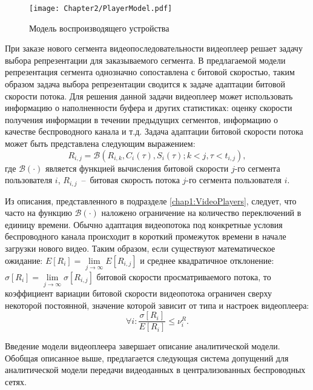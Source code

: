 \begin{figure}[htbp]
\begin{center}
\texttt{[image: Chapter2/PlayerModel.pdf]}
\caption{Модель воспроизводящего устройства}
\label{fig:PlayerModel}
\end{center}
\end{figure}

При заказе нового сегмента видеопоследовательности видеоплеер решает задачу выбора репрезентации для заказываемого сегмента. В предлагаемой модели репрезентация сегмента однозначно сопоставлена с битовой скоростью, таким образом задача выбора репрезентации сводится к задаче адаптации битовой скорости потока. Для решения данной задачи видеоплеер может использовать информацию о наполненности буфера и других статистиках: оценку скорости получения информации в течении предыдущих сегментов, информацию о качестве беспроводного канала и т.д. Задача адаптации битовой скорости потока может быть представлена следующим выражением:
\begin{equation}
\nonumber
R_{i,j} = \mathcal{B}\left(R_{i,k}, C_i(\tau), S_i(\tau); k < j, \tau<t_{i,j} \right),
\end{equation}
где $\mathcal{B}\left(\cdot\right)$ является функцией вычисления битовой скорости $j$-го сегмента пользователя $i$, $R_{i,j}$~--~битовая скорость потока $j$-го сегмента пользователя $i$.

Из описания, представленного в подразделе \ref{chap1:VideoPlayers}, следует, что часто на функцию $\mathcal{B}\left(\cdot\right)$ наложено ограничение на количество переключений в единицу времени. Обычно адаптация видеопотока под конкретные условия беспроводного канала происходит в короткий промежуток времени в начале загрузки нового видео. Таким образом, если существуют математическое ожидание: $E[R_i] = \lim\limits_{j \rightarrow \infty}E[R_{i,j}]$ и среднее квадратичное отклонение: $\sigma\left[R_{i}\right] = \lim\limits_{j \rightarrow \infty}\sigma\left[R_{i,j}\right] $ битовой скорости просматриваемого потока, то коэффициент вариации битовой скорости видеопотока ограничен сверху некоторой постоянной, значение которой зависит от типа и настроек видеоплеера:
\begin{equation}
\forall i: \frac{ \sigma\left[R_{i}\right] }{ E\left[R_{i}\right]} \leq \nu^R_i.
\label{eq:SwitchRatio}
\end{equation}

Введение модели видеоплеера завершает описание аналитической модели. Обобщая описанное выше, предлагается следующая система допущений для аналитической модели передачи видеоданных в централизованных беспроводных сетях.


